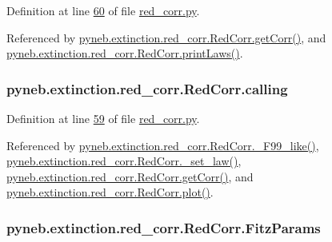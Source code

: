 \begin{DoxyVerb}
Definition at line \hyperlink{red__corr_8py_source_l00060}{60} of file \hyperlink{red__corr_8py_source}{red\-\_\-corr.\-py}.



Referenced by \hyperlink{red__corr_8py_source_l00211}{pyneb.\-extinction.\-red\-\_\-corr.\-Red\-Corr.\-get\-Corr()}, and \hyperlink{red__corr_8py_source_l00134}{pyneb.\-extinction.\-red\-\_\-corr.\-Red\-Corr.\-print\-Laws()}.

\hypertarget{classpyneb_1_1extinction_1_1red__corr_1_1_red_corr_a30606dfd94b4cefefd10dbb1f7cbd473}{
\subsubsection[{calling}]{\setlength{\rightskip}{0pt plus 5cm}pyneb.\-extinction.\-red\-\_\-corr.\-Red\-Corr.\-calling}}\label{classpyneb_1_1extinction_1_1red__corr_1_1_red_corr_a30606dfd94b4cefefd10dbb1f7cbd473}


Definition at line \hyperlink{red__corr_8py_source_l00059}{59} of file \hyperlink{red__corr_8py_source}{red\-\_\-corr.\-py}.



Referenced by \hyperlink{red__corr_8py_source_l00658}{pyneb.\-extinction.\-red\-\_\-corr.\-Red\-Corr.\-\_\-\-F99\-\_\-like()}, \hyperlink{red__corr_8py_source_l00176}{pyneb.\-extinction.\-red\-\_\-corr.\-Red\-Corr.\-\_\-set\-\_\-law()}, \hyperlink{red__corr_8py_source_l00211}{pyneb.\-extinction.\-red\-\_\-corr.\-Red\-Corr.\-get\-Corr()}, and \hyperlink{red__corr_8py_source_l00303}{pyneb.\-extinction.\-red\-\_\-corr.\-Red\-Corr.\-plot()}.

\hypertarget{classpyneb_1_1extinction_1_1red__corr_1_1_red_corr_a133fcc7513d358e629266b24cbe7bebc}{
\subsubsection[{Fitz\-Params}]{\setlength{\rightskip}{0pt plus 5cm}pyneb.\-extinction.\-red\-\_\-corr.\-Red\-Corr.\-Fitz\-Params}}\label{classpyneb_1_1extinction_1_1red__corr_1_1_red_corr_a133fcc7513d358e629266b24cbe7bebc}



\end{DoxyVerb}
